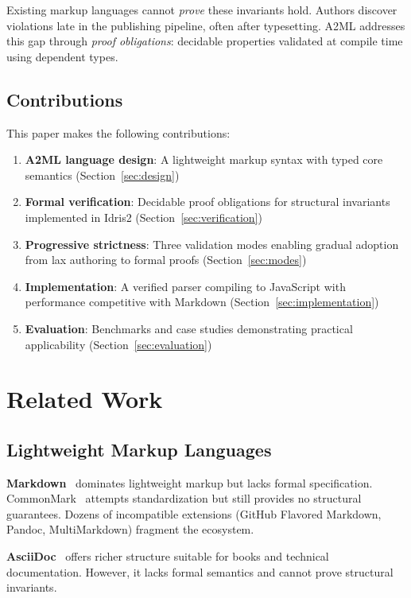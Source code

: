 \documentclass[10pt,twocolumn]{article}
\begin{document}
Existing markup languages cannot \emph{prove} these invariants hold. Authors discover violations late in the publishing pipeline, often after typesetting. A2ML addresses this gap through \emph{proof obligations}: decidable properties validated at compile time using dependent types.

\subsection{Contributions}

This paper makes the following contributions:

\begin{enumerate}
  \item \textbf{A2ML language design}: A lightweight markup syntax with typed core semantics (Section~\ref{sec:design})
  \item \textbf{Formal verification}: Decidable proof obligations for structural invariants implemented in Idris2 (Section~\ref{sec:verification})
  \item \textbf{Progressive strictness}: Three validation modes enabling gradual adoption from lax authoring to formal proofs (Section~\ref{sec:modes})
  \item \textbf{Implementation}: A verified parser compiling to JavaScript with performance competitive with Markdown (Section~\ref{sec:implementation})
  \item \textbf{Evaluation}: Benchmarks and case studies demonstrating practical applicability (Section~\ref{sec:evaluation})
\end{enumerate}

\section{Related Work}

\subsection{Lightweight Markup Languages}

\textbf{Markdown}~\cite{markdown} dominates lightweight markup but lacks formal specification. CommonMark~\cite{commonmark} attempts standardization but still provides no structural guarantees. Dozens of incompatible extensions (GitHub Flavored Markdown, Pandoc, MultiMarkdown) fragment the ecosystem.

\textbf{AsciiDoc}~\cite{asciidoc} offers richer structure suitable for books and technical documentation. However, it lacks formal semantics and cannot prove structural invariants.
\end{document}

